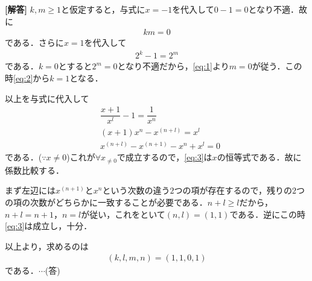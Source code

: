 \documentclass[../../main.tex]{subfiles}
\begin{document}
\begin{oframed}
  
\end{oframed}

{\bf [解答]} $k,m\ge1$と仮定すると，与式に$x=-1$を代入して$0-1=0$となり不適．故に
\begin{align}
  km=0\label{eq:1}
\end{align}
である．さらに$x=1$を代入して
\begin{align}
  2^k-1=2^m\label{eq:2}
\end{align}
である．$k=0$とすると$2^m=0$となり不適だから，\cref{eq:1}より$m=0$が従う．この時\cref{eq:2}から$k=1$となる．

以上を与式に代入して
\begin{align}
  &\dfrac{x+1}{x^l}-1=\dfrac{1}{x^n} \nonumber \\
  &(x+1)x^n-x^{(n+l)}=x^l　\nonumber \\
  &x^{(n+l)}-x^{(n+1)}-x^n+x^l=0 \label{eq:3}
\end{align}
である．($\because x\not=0$)これが$\forall x_{\not=0}$で成立するので，\cref{eq:3}は$x$の恒等式である．故に係数比較する．

まず左辺には$x^{(n+1)}$と$x^n$という次数の違う$2$つの項が存在するので，残りの$2$つの項の次数がどちらかに一致することが必要である．$n+l\ge l$だから，$n+l=n+1$，$n=l$が従い，これをといて$(n,l)=(1,1)$である．逆にこの時\cref{eq:3}は成立し，十分．

以上より，求めるのは
\begin{align}
  (k,l,m,n)=(1,1,0,1)
\end{align}
である．$\cdots$(答)

\newpage
\end{document}
